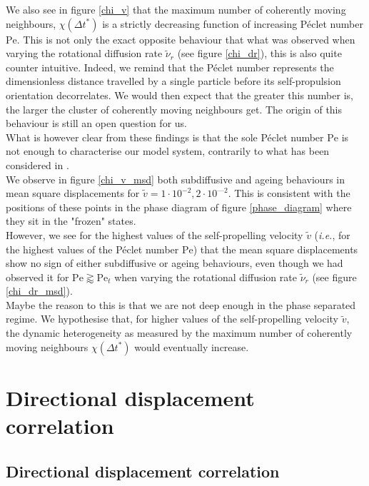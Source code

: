 \documentclass[class=report, float=false, crop=false]{standalone}
\begin{document}
We also see in figure \ref{chi_v} that the maximum number of coherently moving neighbours, $\chi(\Delta t^*)$ is a strictly decreasing function of increasing P\'eclet number $\text{Pe}$. This is not only the exact opposite behaviour that what was observed when varying the rotational diffusion rate $\tilde{\nu}_r$ (see figure \ref{chi_dr}), this is also quite counter intuitive. Indeed, we remind that the P\'eclet number represents the dimensionless distance travelled by a single particle before its self-propulsion orientation decorrelates. We would then expect that the greater this number is, the larger the cluster of coherently moving neighbours get. The origin of this behaviour is still an open question for us.\\

What is however clear from these findings is that the sole P\'eclet number $\text{Pe}$ is not enough to characterise our model system, contrarily to what has been considered in \cite{wysocki2014cooperative}.\\

We observe in figure \ref{chi_v_msd} both subdiffusive and ageing behaviours in mean square displacements for $\tilde{v} = 1\cdot10^{-2}, 2\cdot10^{—2}$. This is consistent with the positions of these points in the phase diagram of figure \ref{phase_diagram} where they sit in the "frozen" states.\\

However, we see for the highest values of the self-propelling velocity $\tilde{v}$ (\textit{i.e.}, for the highest values of the P\'eclet number $\text{Pe}$) that the mean square displacements show no sign of either subdiffusive or ageing behaviours, even though we had observed it for $\text{Pe} \gtrapprox \text{Pe}_t$ when varying the rotational diffusion rate $\tilde{\nu}_r$ (see figure \ref{chi_dr_msd}).\\

Maybe the reason to this is that we are not deep enough in the phase separated regime. We hypothesise that, for higher values of the self-propelling velocity $\tilde{v}$, the dynamic heterogeneity as measured by the maximum number of coherently moving neighbours $\chi(\Delta t^*)$ would eventually increase.

\section{Directional displacement correlation}

\subsection{Directional displacement correlation}
\end{document}

